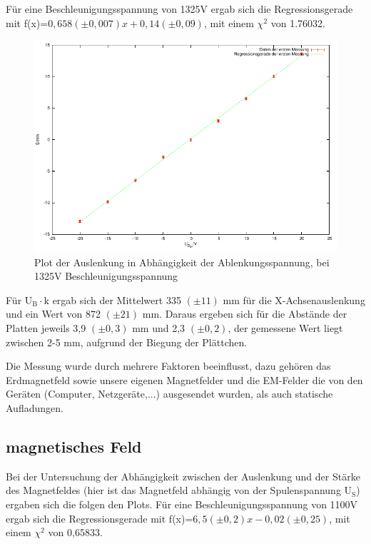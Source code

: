 \documentclass[12pt]{scrartcl}
\begin{document}
\newpage

Für eine Beschleunigungsspannung von 1325V ergab sich die Regressionsgerade mit f(x)=$0,658 (\pm 0,007) x  +0,14 (\pm 0,09)$, mit einem $\chi^2$ von 1.76032.

\begin{figure}[htbp] 
  \centering
    \includegraphics[scale = 1]{y_3.pdf}
  	\caption[Plot der Auslenkung in Abhängigkeit der Ablenkungsspannung, bei 1325V Beschleunigungsspannung]{Plot der Auslenkung in Abhängigkeit der Ablenkungsspannung, bei 1325V Beschleunigungsspannung}
  \label{fig:x_1}
\end{figure}

Für U$_\text{B} \cdot \text{k}$ ergab sich der Mittelwert 335 $(\pm 11)$ mm für die X-Achsenauslenkung und ein Wert von 872	$(\pm 21)$ mm.
Daraus ergeben sich für die Abstände der Platten jeweils 3,9 $(\pm 0,3)$ mm und 2,3	$(\pm 0,2)$, der gemessene Wert liegt zwischen 2-5 mm, aufgrund der Biegung der Plättchen.

Die Messung wurde durch mehrere Faktoren beeinflusst, dazu gehören das Erdmagnetfeld sowie unsere eigenen Magnetfelder und die EM-Felder die von den Geräten (Computer, Netzgeräte,...) ausgesendet wurden, als auch statische Aufladungen.

\subsection{magnetisches Feld}

Bei der Untersuchung der Abhängigkeit zwischen der Auslenkung und der Stärke des Magnetfeldes (hier ist das Magnetfeld abhängig von der Spulenspannung U$_\text{S}$) ergaben sich die folgen den Plots.
\newpage
Für eine Beschleunigungsspannung von 1100V ergab sich die Regressionsgerade mit f(x)=$6,5 (\pm 0,2) x  - 0,02 (\pm 0,25)$, mit einem $\chi^2$ von 0,65833.
\end{document}
